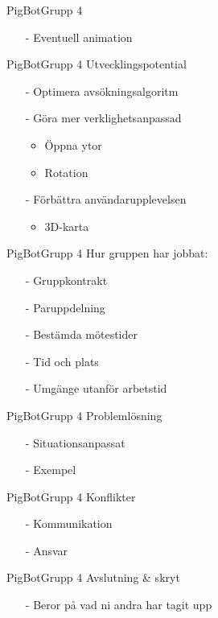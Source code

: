 \begin{frame}[fragile]{PigBot}{Grupp 4}
  \begin{itemize}
    \item[-] Eventuell animation 
  \end{itemize}
\end{frame}

\begin{frame}[fragile]{PigBot}{Grupp 4}
Utvecklingspotential 
  \begin{itemize}
 \pause
    \item[-] Optimera avsökningsalgoritm
 \pause
    \item[-] Göra mer verklighetsanpassad
	\begin{itemize}
	  \item Öppna ytor
	  \item Rotation
	\end{itemize}	
  \pause
    \item[-] Förbättra användarupplevelsen
     	\begin{itemize}
	  \item 3D-karta
	\end{itemize}
   \end{itemize}
\end{frame}


\begin{frame}[fragile]{PigBot}{Grupp 4}
Hur gruppen har jobbat:
  \begin{itemize}
 \pause
    \item[-] Gruppkontrakt 
\pause
    \item[-] Paruppdelning
\pause
    \item[-] Bestämda mötestider
\pause
    \item[-] Tid och plats
\pause
    \item[-] Umgänge utanför arbetstid
  \end{itemize}
\end{frame}

\begin{frame}[fragile]{PigBot}{Grupp 4}
Problemlösning
  \begin{itemize}
 \pause
    \item[-] Situationsanpassat
\pause
    \item[-] Exempel
  \end{itemize}
\end{frame}

\begin{frame}[fragile]{PigBot}{Grupp 4}
Konflikter
  \begin{itemize}
 \pause
    \item[-] Kommunikation
\pause
    \item[-] Ansvar
  \end{itemize}
\end{frame}

\begin{frame}[fragile]{PigBot}{Grupp 4}
Avslutning \& skryt
  \begin{itemize}
 \pause
    \item[-] Beror på vad ni andra har tagit upp
  \end{itemize}
\end{frame}


